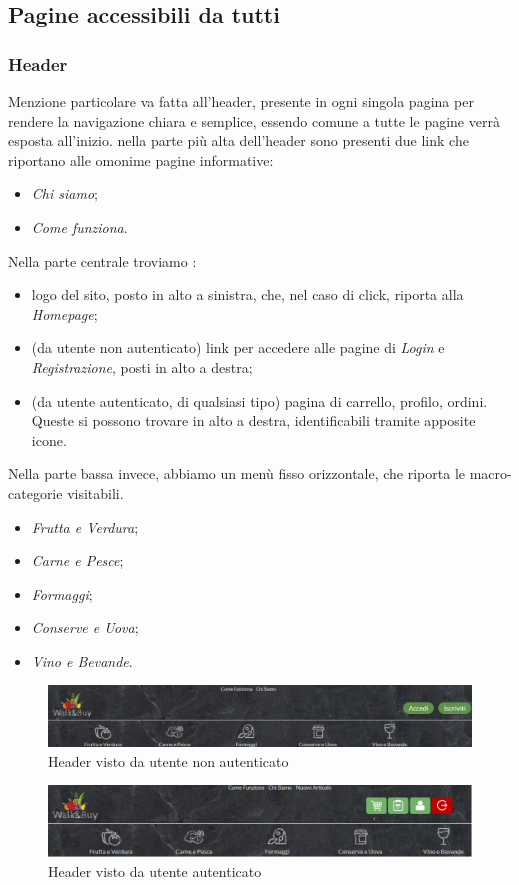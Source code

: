 \subsection{Pagine accessibili da tutti}
	\subsubsection{Header}
		Menzione particolare va fatta all'header, presente in ogni singola pagina per rendere la navigazione chiara e semplice, essendo comune a tutte le pagine verrà esposta all'inizio.
		nella parte più alta dell'header sono presenti due link che riportano alle omonime pagine informative:
		\begin{itemize}
			\item \textit{Chi siamo};
			\item \textit{Come funziona}.
		\end{itemize}

		Nella parte centrale troviamo :
		\begin{itemize}
			\item logo del sito, posto in alto a sinistra, che, nel caso di click, riporta alla \textit{Homepage};
			\item (da utente non autenticato) link per accedere alle pagine di \textit{Login} e \textit{Registrazione}, posti in alto a destra;
			\item (da utente autenticato, di qualsiasi tipo) pagina di carrello, profilo, ordini. Queste si possono trovare in alto a destra, identificabili tramite apposite icone.
		\end{itemize}

		Nella parte bassa invece, abbiamo un menù fisso orizzontale, che riporta le macro-categorie visitabili.
		\begin{itemize}
			\item \textit{Frutta e Verdura};
			\item \textit{Carne e Pesce};
			\item \textit{Formaggi};
			\item \textit{Conserve e Uova};
			\item \textit{Vino e Bevande}.
		\end{itemize}
	\begin{figure}[H]
		\includegraphics[width=\linewidth]{res/img/HeaderNA}
		\caption{Header visto da utente non autenticato}
		\label{Header visto da utente non autenticato}
	\end{figure}
	\begin{figure}[H]
		\includegraphics[width=\linewidth]{res/img/HeaderAut}
		\caption{Header visto da utente autenticato}
		\label{Header visto da utente autenticato, azienda in questo caso}
	\end{figure}

